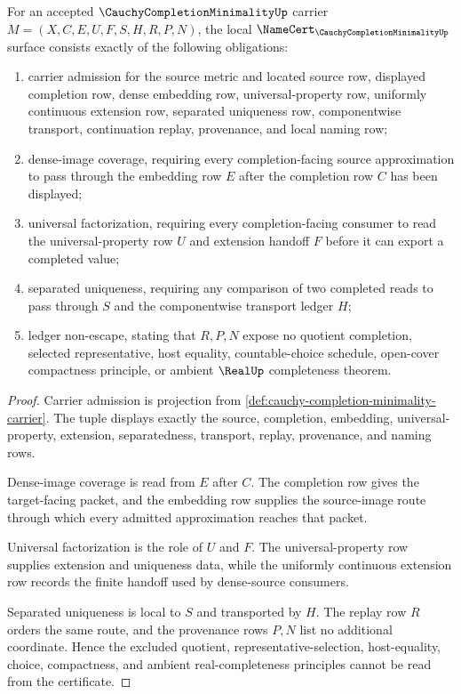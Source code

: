 \begin{theorem}
\label{thm:cauchy-completion-minimality-namecert-obligations}
For an accepted $\CauchyCompletionMinimalityUp$ carrier $M=(X,C,E,U,F,S,H,R,P,N)$, the local $\NameCert_{\CauchyCompletionMinimalityUp}$ surface consists exactly of the following obligations:
\begin{enumerate}
\item carrier admission for the source metric and located source row, displayed completion row, dense embedding row, universal-property row, uniformly continuous extension row, separated uniqueness row, componentwise transport, continuation replay, provenance, and local naming row;
\item dense-image coverage, requiring every completion-facing source approximation to pass through the embedding row $E$ after the completion row $C$ has been displayed;
\item universal factorization, requiring every completion-facing consumer to read the universal-property row $U$ and extension handoff $F$ before it can export a completed value;
\item separated uniqueness, requiring any comparison of two completed reads to pass through $S$ and the componentwise transport ledger $H$;
\item ledger non-escape, stating that $R,P,N$ expose no quotient completion, selected representative, host equality, countable-choice schedule, open-cover compactness principle, or ambient $\RealUp$ completeness theorem.
\end{enumerate}
\end{theorem}
\begin{proof}
Carrier admission is projection from \autoref{def:cauchy-completion-minimality-carrier}. The tuple displays exactly the source, completion, embedding, universal-property, extension, separatedness, transport, replay, provenance, and naming rows.

Dense-image coverage is read from $E$ after $C$. The completion row gives the target-facing packet, and the embedding row supplies the source-image route through which every admitted approximation reaches that packet.

Universal factorization is the role of $U$ and $F$. The universal-property row supplies extension and uniqueness data, while the uniformly continuous extension row records the finite handoff used by dense-source consumers.

Separated uniqueness is local to $S$ and transported by $H$. The replay row $R$ orders the same route, and the provenance rows $P,N$ list no additional coordinate. Hence the excluded quotient, representative-selection, host-equality, choice, compactness, and ambient real-completeness principles cannot be read from the certificate.
\end{proof}

